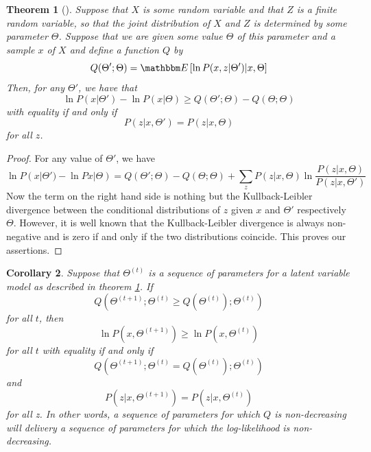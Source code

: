 \documentclass[a4paper, draft]{article}
\theoremstyle{own}
\newtheorem{thm}{Theorem}[section]
\newtheorem{cor}[thm]{Corollary}
\theoremstyle{remark}
\begin{document}
\begin{thm}[\cite{Dempster77}]\label{thm:em}
Suppose that $X$ is some random variable and that $Z$ is a finite random variable, so that the joint distribution of $X$ and $Z$ is determined by some parameter $\Theta$. Suppose that we are given some value $\Theta$ of this parameter and a sample $x$ of $X$ and define a function $Q$ by
$$
Q(\Theta'; \Theta) = {\mathbbm E} \left[  \ln P(x,z | \Theta')  | x, \Theta \right]
$$
Then, for any $\Theta'$, we have that
$$
\ln P(x | \Theta') - \ln P(x | \Theta) \geq
Q(\Theta' ; \Theta) - Q(\Theta ; \Theta) 
$$
with equality if and only if 
$$
P(z | x, \Theta') = P(z | x, \Theta)
$$
for all $z$.
\end{thm}

\begin{proof}
For any value of $\Theta'$, we have
$$
\ln P(x | \Theta') - \ln Px | \Theta) = 
Q(\Theta' ; \Theta) - Q(\Theta ; \Theta) 
+
\sum_z P(z | x, \Theta) \ln \frac{P(z | x, \Theta)}{P(z | x, \Theta')}
$$
Now the term on the right hand side is nothing but the Kullback-Leibler divergence
between the conditional distributions of $z$ given $x$ and $\Theta'$ respectively
$\Theta$. However, it is well known that the Kullback-Leibler divergence is always non-negative and is zero if and only if the two distributions coincide. This proves our assertions.
\end{proof}

\begin{cor}\label{cor:emalgorithm}
Suppose that $\Theta^{(t)}$ is a sequence of parameters for a latent variable model as described in theorem \ref{thm:em}. If
$$
Q(\Theta^{(t+1)};\Theta^{(t)} \geq Q(\Theta^{(t)}) ; \Theta^{(t)})
$$
for all $t$, then
$$
\ln P(x, \Theta^{(t+1)}) \geq \ln P(x, \Theta^{(t)})
$$
for all $t$ with equality if and only if
$$
Q(\Theta^{(t+1)};\Theta^{(t)} = Q(\Theta^{(t)}) ; \Theta^{(t)})
$$
and
$$
P(z | x, \Theta^{(t+1)}) = P(z | x, \Theta^{(t)})
$$
for all z. In other words, a sequence of parameters for which $Q$ is non-decreasing will delivery a sequence of parameters for which the log-likelihood is non-decreasing.
\end{cor}
\end{document}
